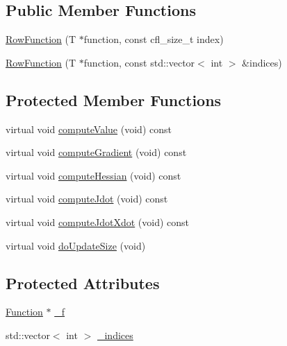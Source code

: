 \subsection*{Public Member Functions}
\begin{DoxyCompactItemize}
\item 
\hyperlink{classocra_1_1RowFunction_aed18ba241ac62a2c8013593f424b60d5}{Row\+Function} (T $\ast$function, const cfl\+\_\+size\+\_\+t index)
\item 
\hyperlink{classocra_1_1RowFunction_a19b2063d4ec61b91fdd8793321414f7d}{Row\+Function} (T $\ast$function, const std\+::vector$<$ int $>$ \&indices)
\end{DoxyCompactItemize}
\subsection*{Protected Member Functions}
\begin{DoxyCompactItemize}
\item 
virtual void \hyperlink{classocra_1_1RowFunction_a99dfb80d85d71b217b49c9ef22dcd361}{compute\+Value} (void) const
\item 
virtual void \hyperlink{classocra_1_1RowFunction_a3d32e6e76f2f4aed5630e0a59cf08756}{compute\+Gradient} (void) const
\item 
virtual void \hyperlink{classocra_1_1RowFunction_ab9d6a1f29d2a3756700e2200d402b4fb}{compute\+Hessian} (void) const
\item 
virtual void \hyperlink{classocra_1_1RowFunction_a1ec66fcc1c35b323c38f3798f2439172}{compute\+Jdot} (void) const
\item 
virtual void \hyperlink{classocra_1_1RowFunction_a6e6009f89040ce403c6b1463dc82b29d}{compute\+Jdot\+Xdot} (void) const
\item 
virtual void \hyperlink{classocra_1_1RowFunction_ae2072d38459752174b456af8497da969}{do\+Update\+Size} (void)
\end{DoxyCompactItemize}
\subsection*{Protected Attributes}
\begin{DoxyCompactItemize}
\item 
\hyperlink{classocra_1_1Function}{Function} $\ast$ \hyperlink{classocra_1_1RowFunction_a336ba922ce93c2c1357b4298acfd0c2b}{\+\_\+f}
\item 
std\+::vector$<$ int $>$ \hyperlink{classocra_1_1RowFunction_afaa713596ca3c785cd9bb7599518ab0e}{\+\_\+indices}
\end{DoxyCompactItemize}


